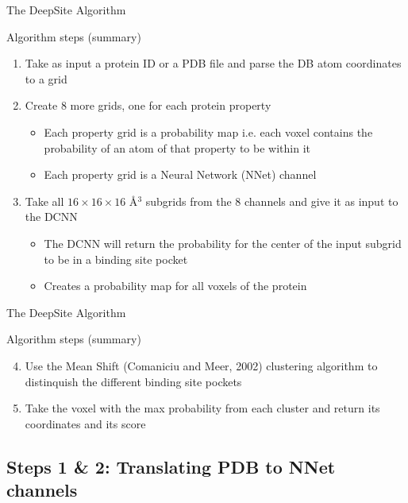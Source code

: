 \documentclass{beamer}
\begin{document}
\begin{frame}{The DeepSite Algorithm}
  \begin{block}{Algorithm steps (summary)}
    \begin{enumerate}
      \item Take as input a protein ID or a PDB file and parse the DB atom coordinates to a grid
      \item Create 8 more grids, one for each protein property
      \begin{itemize}
        \item Each property grid is a probability map i.e. each voxel contains the probability of an atom of that property to be within it
        \item Each property grid is a Neural Network (NNet) channel
      \end{itemize}
      \item Take all $16 \times 16 \times 16$ \AA$^3$ subgrids from the 8 channels and give it as input to the DCNN
      \begin{itemize}
        \item The DCNN will return the probability for the center of the input subgrid to be in a binding site pocket
        \item Creates a probability map for all voxels of the protein
      \end{itemize}
    \end{enumerate}
  \end{block}
\end{frame}

\begin{frame}{The DeepSite Algorithm}
  \begin{block}{Algorithm steps (summary)}
    \begin{enumerate}
      \setcounter{enumi}{3}
      \item Use the Mean Shift (Comaniciu and Meer, 2002) clustering algorithm to distinquish the different binding site pockets
      \item Take the voxel with the max probability from each cluster and return its coordinates and its score
    \end{enumerate}
  \end{block}
\end{frame}

\subsection{Steps 1 & 2: Translating PDB to NNet channels}
\end{document}
